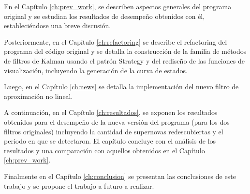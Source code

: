 En el Cap\'itulo \ref{ch:prev_work}, se describen aspectos generales del programa original y se estudian los resultados de desempe\~no obtenidos con \'el, estableci\'endose una breve discusi\'on. 
\bigskip

Posteriormente, en el Cap\'itulo \ref{ch:refactoring} se describe el refactoring del programa  del c\'odigo original y se detalla la construcci\'on de la familia de m\'etodos de filtros de Kalman usando el patr\'on Strategy y del redise\~no de las funciones de visualizaci\'on, incluyendo la generaci\'on de la curva de estados.
\bigskip

Luego, en el Cap\'itulo \ref{ch:news} se detalla la implementaci\'on del nuevo filtro de aproximaci\'on no lineal.
\bigskip

A continuaci\'on, en el Cap\'itulo \ref{ch:resultados}, se exponen los resultados obtenidos para el desempe\~no de la nueva versi\'on del programa (para los dos filtros originales) incluyendo la cantidad de supernovas redescubiertas y el per\'iodo en que se detectaron. El cap\'itulo concluye con el an\'alisis de los resultados y una comparaci\'on con aquellos obtenidos en el Cap\'itulo \ref{ch:prev_work}.
\bigskip

Finalmente en el Cap\'itulo \ref{ch:conclusion} se presentan las conclusiones de este trabajo y se propone el trabajo a futuro a realizar.


